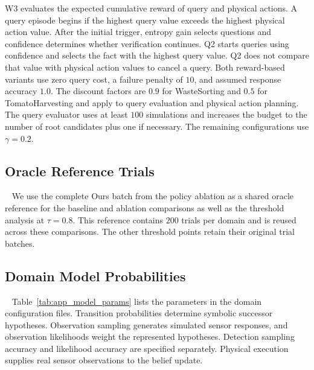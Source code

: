 W3 evaluates the expected cumulative reward of query and physical actions. A query episode begins if the highest query value exceeds the highest physical action value. After the initial trigger, entropy gain selects questions and confidence determines whether verification continues. Q2 starts queries using confidence and selects the fact with the highest query value. Q2 does not compare that value with physical action values to cancel a query. Both reward-based variants use zero query cost, a failure penalty of $10$, and assumed response accuracy $1.0$. The discount factors are $0.9$ for WasteSorting and $0.5$ for TomatoHarvesting and apply to query evaluation and physical action planning. The query evaluator uses at least $100$ simulations and increases the budget to the number of root candidates plus one if necessary. The remaining configurations use $\gamma=0.2$.

\subsection{Oracle Reference Trials}~\label{appx:oracle_reference}
We use the complete Ours batch from the policy ablation as a shared oracle reference for the baseline and ablation comparisons as well as the threshold analysis at $\tau=0.8$. This reference contains $200$ trials per domain and is reused across these comparisons. The other threshold points retain their original trial batches.

\subsection{Domain Model Probabilities}~\label{appx:model_params}
Table~\ref{tab:app_model_params} lists the parameters in the domain configuration files. Transition probabilities determine symbolic successor hypotheses. Observation sampling generates simulated sensor responses, and observation likelihoods weight the represented hypotheses. Detection sampling accuracy and likelihood accuracy are specified separately. Physical execution supplies real sensor observations to the belief update.

